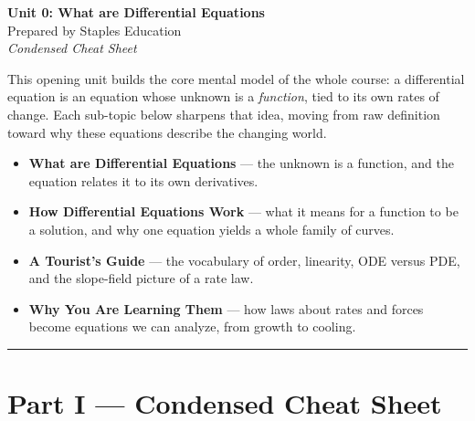 \documentclass[11pt]{article}
\begin{document}
\begin{center}
    {\LARGE \bfseries Unit 0: What are Differential Equations}\\[6pt]
    {\large Prepared by Staples Education}\\[4pt]
    {\itshape Condensed Cheat Sheet}
\end{center}

\vspace{0.4em}

\begin{topicsbox}
This opening unit builds the core mental model of the whole course: a
differential equation is an equation whose unknown is a \emph{function}, tied
to its own rates of change. Each sub-topic below sharpens that idea, moving
from raw definition toward why these equations describe the changing world.
\begin{itemize}[leftmargin=1.4em, itemsep=3pt]
    \item \textbf{What are Differential Equations} --- the unknown is a
          function, and the equation relates it to its own derivatives.
    \item \textbf{How Differential Equations Work} --- what it means for a
          function to be a solution, and why one equation yields a whole
          family of curves.
    \item \textbf{A Tourist's Guide} --- the vocabulary of order, linearity,
          ODE versus PDE, and the slope-field picture of a rate law.
    \item \textbf{Why You Are Learning Them} --- how laws about rates and
          forces become equations we can analyze, from growth to cooling.
\end{itemize}
\end{topicsbox}

\vspace{0.6em}
\hrule
\vspace{0.6em}

\section*{Part I --- Condensed Cheat Sheet}
\setcounter{section}{0}   %
\end{document}
